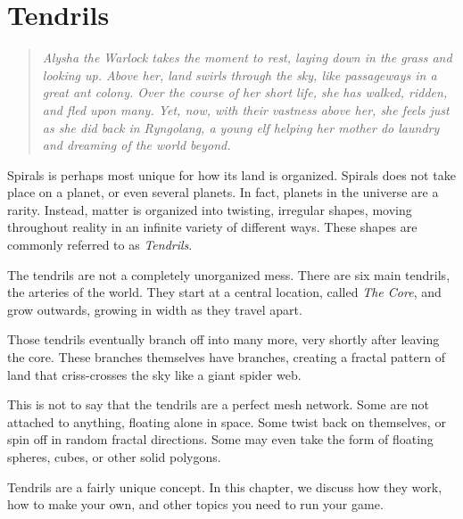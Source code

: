 \chapter{Tendrils}

\begin{quote}
\itshape
Alysha the Warlock takes the moment to rest, laying down in the grass and looking up.
Above her, land swirls through the sky, like passageways in a great ant colony.
Over the course of her short life, she has walked, ridden, and fled upon many.
Yet, now, with their vastness above her, she feels just as she did back in Ryngolang, a young elf helping her mother do laundry and dreaming of the world beyond.
\end{quote}

Spirals is perhaps most unique for how its land is organized.
Spirals does not take place on a planet, or even several planets.
In fact, planets in the universe are a rarity.
Instead, matter is organized into twisting, irregular shapes, moving throughout reality in an infinite variety of different ways.
These shapes are commonly referred to as \textit{Tendrils}.

The tendrils are not a completely unorganized mess.
There are six main tendrils, the arteries of the world. They start at a central location, called \textit{The Core}, and grow outwards, growing in width as they travel apart.

Those tendrils eventually branch off into many more, very shortly after leaving the core.
These branches themselves have branches, creating a fractal pattern of land that criss-crosses the sky like a giant spider web.

This is not to say that the tendrils are a perfect mesh network.
Some are not attached to anything, floating alone in space.
Some twist back on themselves, or spin off in random fractal directions.
Some may even take the form of floating spheres, cubes, or other solid polygons.

Tendrils are a fairly unique concept.
In this chapter, we discuss how they work, how to make your own, and other topics you need to run your game.

